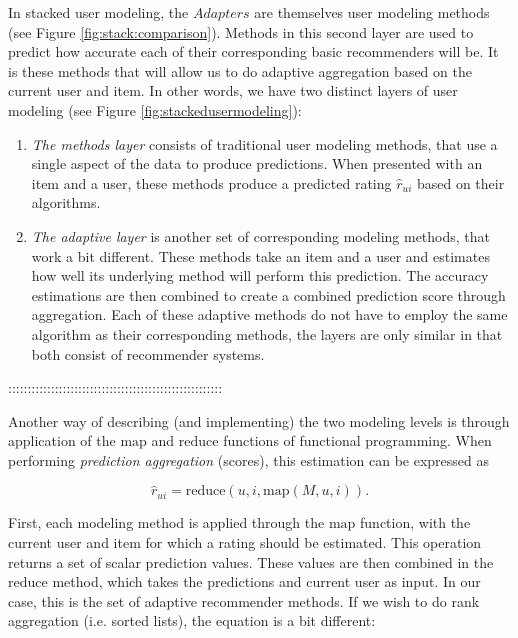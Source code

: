 In stacked user modeling, the $Adapters$ are themselves user modeling methods 
(see Figure \ref{fig:stack:comparison}).
Methods in this second layer are used to predict how accurate each of their corresponding basic recommenders will be.
It is these methods that will allow us to do adaptive aggregation based on the current user and item.
In other words, we have two distinct layers of user modeling 
(see Figure \ref{fig:stackedusermodeling}):



\begin{enumerate}
  \item
    \emph{The methods layer} consists of traditional user modeling methods, that use a single aspect of the data to produce predictions.
    When presented with an item and a user, these methods produce a predicted rating $\hat{r}_{ui}$ based on their algorithms.
  \item
    \emph{The adaptive layer} is another set of corresponding modeling methods, that work a bit different.
    These methods take an item and a user and estimates how well its underlying method will perform this prediction.
    The accuracy estimations are then combined to create a combined prediction score through aggregation.
    Each of these adaptive methods do not have to employ the same algorithm as their corresponding methods,
    the layers are only similar in that both consist of recommender systems.
\end{enumerate}

:::::::::::::::::::::::::::::::::::::::::::::::::::::::

Another way of describing (and implementing) the two modeling levels is through application
of the $\mathrm{map}$ and $\mathrm{reduce}$ functions of functional programming.
When performing \emph{prediction aggregation} (scores), this estimation can be expressed as

\begin{equation*}
  \hat{r}_{ui} = \mathrm{reduce}(u, i, \mathrm{map}(M, u, i)).
\end{equation*}

First, each modeling method is applied through the $\mathrm{map}$ function, with the current user and item for which
a rating should be estimated. This operation returns a set of scalar prediction values. These values are then
combined in the $\mathrm{reduce}$ method, which takes the predictions and current user as input.
In our case, this is the set of adaptive recommender methods. 
If we wish to do rank aggregation (i.e. sorted lists), the equation is a bit different:

